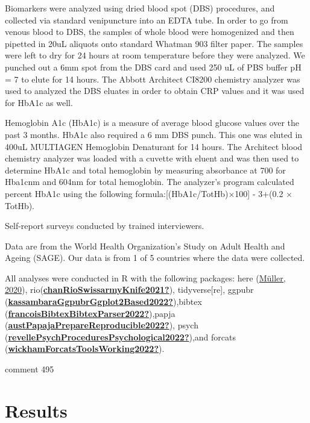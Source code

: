 \documentclass[
  man]{apa6}
\begin{document}
Biomarkers were analyzed using dried blood spot (DBS) procedures, and collected via standard venipuncture into an EDTA tube. In order to go from venous blood to DBS, the samples of whole blood were homogenized and then pipetted in 20uL aliquots onto standard Whatman 903 filter paper. The samples were left to dry for 24 hours at room temperature before they were analyzed. We punched out a 6mm spot from the DBS card and used 250 uL of PBS buffer pH = 7 to elute for 14 hours. The Abbott Architect CI8200 chemistry analyzer was used to analyzed the DBS eluates in order to obtain CRP values and it was used for HbA1c as well.

Hemoglobin A1c (HbA1c) is a measure of average blood glucose values over the past 3 months. HbA1c also required a 6 mm DBS punch. This one was eluted in 400uL MULTIAGEN Hemoglobin Denaturant for 14 hours. The Architect blood chemistry analyzer was loaded with a cuvette with eluent and was then used to determine HbA1c and total hemoglobin by measuring absorbance at 700 for Hba1cnm and 604nm for total hemoglobin. The analyzer's program calculated percent HbA1c using the following formula:{[}(HbA1c/TotHb)×100{]} - 3+(0.2 × TotHb).

Self-report surveys conducted by trained interviewers.

Data are from the World Health Organization's Study on Adult Health and Ageing (SAGE). Our data is from 1 of 5 countries where the data were collected.

All analyses were conducted in R with the following packages:
here (\protect\hyperlink{ref-here}{Müller, 2020}), rio(\protect\hyperlink{ref-chanRioSwissarmyKnife2021}{\textbf{chanRioSwissarmyKnife2021?}}), tidyverse{[}re{]}, ggpubr (\protect\hyperlink{ref-kassambaraGgpubrGgplot2Based2022}{\textbf{kassambaraGgpubrGgplot2Based2022?}}),bibtex (\protect\hyperlink{ref-francoisBibtexBibtexParser2022}{\textbf{francoisBibtexBibtexParser2022?}}),papja (\protect\hyperlink{ref-austPapajaPrepareReproducible2022}{\textbf{austPapajaPrepareReproducible2022?}}), psych
(\protect\hyperlink{ref-revellePsychProceduresPsychological2022}{\textbf{revellePsychProceduresPsychological2022?}}),and forcats (\protect\hyperlink{ref-wickhamForcatsToolsWorking2022}{\textbf{wickhamForcatsToolsWorking2022?}}).

comment 495

\hypertarget{results}{%
\section{Results}\label{results}}
\end{document}
